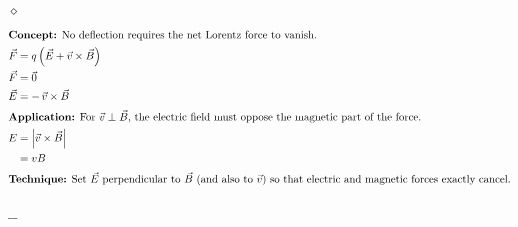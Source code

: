 \documentclass[preview, border={10mm, 5mm, 10mm, 10mm}]{standalone}
\title{\textsc{}}
\newenvironment{idea}{\par\noindent\color{violet!80!black}$\diamond$\enspace\ignorespaces}{\par}
\begin{document}
\begin{idea}
    \begin{align*}
    \intertext{\textbf{Concept:} No deflection requires the net Lorentz force to vanish.}
    \vec{F} &= q\left(\vec{E}+\vec{v}\times\vec{B}\right) \\
    \vec{F} &= \vec{0} \\
    \vec{E} &= -\,\vec{v}\times\vec{B} \\
    \intertext{\textbf{Application:} For $\vec{v}\perp\vec{B}$, the electric field must oppose the magnetic part of the force.}
    E &= \left|\vec{v}\times\vec{B}\right| \\
    &= vB \\
    \intertext{\textbf{Technique:} Set $\vec{E}$ perpendicular to $\vec{B}$ (and also to $\vec{v}$) so that electric and magnetic forces exactly cancel.}
    \end{align*}
\end{idea}
\hfill $\_\_$
\end{document}
